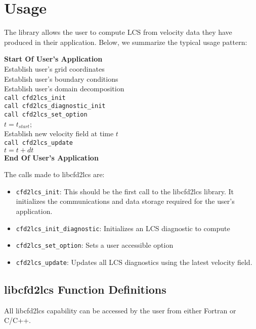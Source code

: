 \documentclass[letterpaper,12pt]{article}
\begin{document}
\section{Usage}
The library allows the user to compute LCS from velocity data they have produced in their application.  Below, we summarize the typical usage pattern:
\begin{algorithm}
\DontPrintSemicolon %
{\bf Start Of User's Application}\\
Establish user's grid coordinates \\
Establish user's boundary conditions\\
Establish user's domain decomposition\\
\verb|call cfd2lcs_init|\\
\verb|call cfd2lcs_diagnostic_init| \\
\verb|call cfd2lcs_set_option| \\ 
$t=t_{start}$;\\
 {
Establish new velocity field at time $t$\\
\texttt{call cfd2lcs\_update}\\
$t = t+dt$\\
}
{\bf End Of User's Application}\\
\label{algo:max}
\end{algorithm}

The calls made to libcfd2lcs are:
\begin{itemize}
 \item \verb|cfd2lcs_init|:  This should be the first call to the libcfd2lcs library.  It initializes the communications and data storage required for the user's application.
 \item \verb|cfd2lcs_init_diagnostic|:  Initializes an LCS diagnostic to compute
 \item \verb|cfd2lcs_set_option|: Sets a user accessible option
 \item \verb|cfd2lcs_update|:  Updates all LCS diagnostics using the latest velocity field.
\end{itemize}
\clearpage
\subsection{libcfd2lcs Function Definitions}
All libcfd2lcs capability can be accessed by the user from either Fortran or C/C++.
\end{document}
